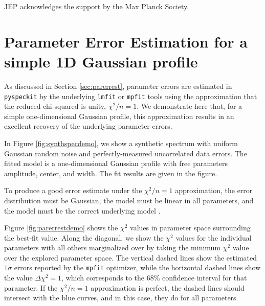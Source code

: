 \documentclass[twocolumn]{aastex63}
\newcommand{\pyspeckit}{\texttt{pyspeckit}\xspace}
\begin{document}
\acknowledgments
%
JEP acknowledges the support by the Max Planck Society. 





\appendix
\section{Parameter Error Estimation for a simple 1D Gaussian profile}
\label{appendix:parerrest}
As discussed in Section \ref{sec:parerrest}, parameter errors are estimated in
\pyspeckit by the underlying \texttt{lmfit} or \texttt{mpfit} tools using the
approximation that the reduced chi-squared is unity, $\chi^2/n=1$.  We
demonstrate here that, for a simple one-dimensional Gaussian profile, this
approximation results in an excellent recovery of the
underlying parameter errors.

In Figure \ref{fig:synthspecdemo}, we show a synthetic spectrum with uniform
Gaussian random noise and perfectly-measured uncorrelated data errors.
The fitted model is a one-dimensional Gaussian profile with free parameters
amplitude, center, and width.  The fit results are given in the figure.

To produce a good error estimate under the $\chi^2/n=1$ approximation, the error
distribution must be Gaussian, the model must be
linear in all parameters, and the model must be the correct underlying model
\citep{Andrae2010b}.

Figure \ref{fig:parerrestdemo} shows the $\chi^2$ values in parameter space
surrounding the best-fit value.  Along the diagonal, we show the $\chi^2$
values for the individual parameters with all others marginalized over
by taking the minimum $\chi^2$ value over the explored parameter space.  The vertical
dashed lines show the estimated $1\sigma$ errors reported by the \texttt{mpfit}
optimizer, while the
horizontal dashed lines show the value $\Delta\chi^2=1$, which corresponds to
the 68\% confidence interval for that parameter.  If the $\chi^2/n=1$
approximation is perfect, the dashed lines should intersect with the blue curves, and in this case, they do for all parameters.  
\end{document}
